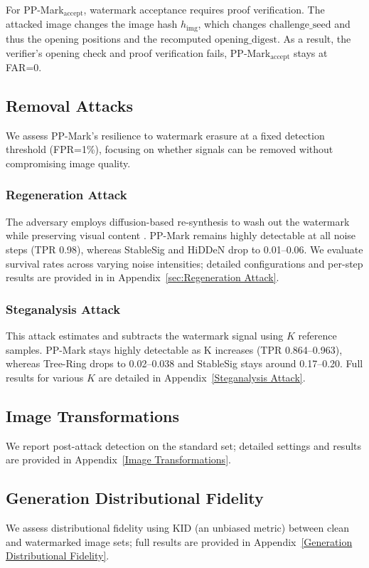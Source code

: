 \documentclass{article}
\theoremstyle{plain}
\theoremstyle{definition}
\theoremstyle{remark}
\begin{document}
For PP-Mark$_{\mathrm{accept}}$, watermark acceptance requires proof verification. The
attacked image changes the image hash $h_{\mathrm{img}}$, which changes 
$\mathrm{challenge\_seed}$ and thus the opening positions and the recomputed 
$\mathrm{opening\_digest}$. As a result, the verifier’s opening check and proof verification fails, PP‑Mark$_{\mathrm{accept}}$ stays at FAR=0.

\subsection{Removal Attacks}
We assess PP-Mark’s resilience to watermark erasure at a fixed detection threshold (FPR=1\%), focusing on whether signals can be removed without compromising image quality.

\subsubsection{Regeneration Attack}
The adversary employs diffusion-based re-synthesis to wash out the watermark while preserving visual content \cite{zhao2024removable}. PP-Mark remains highly detectable at all noise steps (TPR 0.98), whereas StableSig and HiDDeN drop to 0.01–0.06. We evaluate survival rates across varying noise intensities; detailed configurations and per-step results are provided in in Appendix~\ref{sec:Regeneration Attack}. 

\subsubsection{Steganalysis Attack}
This attack estimates and subtracts the watermark signal using $K$ reference samples. PP-Mark stays highly detectable as K increases (TPR 0.864–0.963), whereas Tree-Ring drops to 0.02–0.038 and StableSig stays around 0.17–0.20. Full results for various $K$ are detailed in Appendix~\ref{Steganalysis Attack}.

\subsection{Image Transformations}
We report post-attack detection on the standard set; detailed settings and results are provided in Appendix~\ref{Image Transformations}.

\subsection{Generation Distributional Fidelity}
We assess distributional fidelity using KID (an unbiased metric) between clean and watermarked image sets; full results are provided in Appendix~\ref{Generation Distributional Fidelity}.
\end{document}
